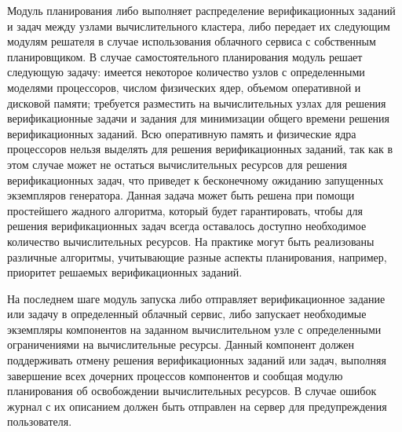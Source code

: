 Модуль планирования либо выполняет распределение верификационных заданий и задач между узлами вычислительного кластера, либо передает их следующим модулям решателя в случае использования облачного сервиса с собственным планировщиком.
В случае самостоятельного планирования модуль решает следующую задачу: имеется некоторое количество узлов с определенными моделями процессоров, числом физических ядер, объемом оперативной и дисковой памяти; требуется разместить на вычислительных узлах для решения верификационные задачи и задания для минимизации общего времени решения верификационных заданий.
Всю оперативную память и физические ядра процессоров нельзя выделять для решения верификационных заданий, так как в этом случае может не остаться вычислительных ресурсов для решения верификационных задач, что приведет к бесконечному ожиданию запущенных экземпляров генератора.
Данная задача может быть решена при помощи простейшего жадного алгоритма, который будет гарантировать, чтобы для решения верификационных задач всегда оставалось доступно необходимое количество вычислительных ресурсов.
На практике могут быть реализованы различные алгоритмы, учитывающие разные аспекты планирования, например, приоритет решаемых верификационных заданий.

На последнем шаге модуль запуска либо отправляет верификационное задание или задачу в определенный облачный сервис, либо запускает необходимые экземпляры компонентов на заданном вычислительном узле с определенными ограничениями на вычислительные ресурсы.
Данный компонент должен поддерживать отмену решения верификационных заданий или задач, выполняя завершение всех дочерних процессов компонентов и сообщая модулю планирования об освобождении вычислительных ресурсов.
В случае ошибок журнал с их описанием должен быть отправлен на сервер для предупреждения пользователя.
